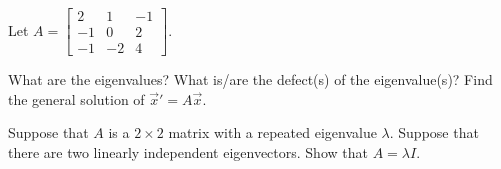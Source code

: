 \documentclass{ximera}
\begin{document}
\begin{exercise}
    Let $A = 
    \left[ 
        \begin{smallmatrix}
            2 & 1 & -1 \\
            -1 & 0 & 2 \\
            -1 & -2 & 4
        \end{smallmatrix} 
    \right]$.
    \begin{tasks}
        \task What are the eigenvalues?
        \task What is/are the defect(s) of the eigenvalue(s)?
        \task Find the general solution of ${\vec{x}}' = A \vec{x}$.
    \end{tasks}
\end{exercise}

\begin{exercise}
    Suppose that $A$ is a $2 \times 2$ matrix with a repeated eigenvalue $\lambda$. Suppose that there are two linearly independent eigenvectors.  Show that $A = \lambda I$.
\end{exercise}
\end{document}

